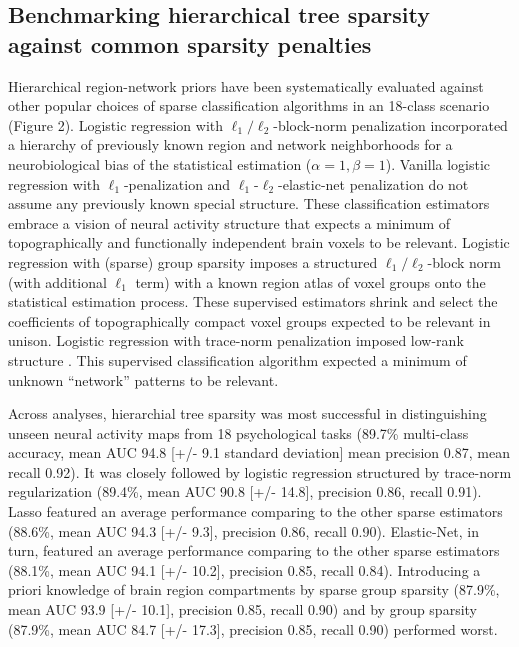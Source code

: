 \documentclass{article}
\begin{document}
\subsection{Benchmarking hierarchical tree sparsity against
common sparsity penalties}
Hierarchical region-network priors have been systematically
evaluated against other popular choices of sparse classification algorithms
in an 18-class scenario
(Figure 2).
%
Logistic regression with $\ell_1/\ell_2$-block-norm penalization
incorporated a hierarchy of previously known region and network neighborhoods
for a neurobiological bias of the statistical estimation
($\alpha = 1, \beta = 1$).
%
Vanilla logistic regression with $\ell_1$-penalization and
$\ell_1$-$\ell_2$-elastic-net penalization
do not assume any previously known special structure.
These classification estimators embrace a vision of neural activity structure
that expects a minimum of
topographically and functionally independent brain voxels to be relevant.
%
Logistic regression with (sparse) group sparsity
imposes a structured $\ell_1/\ell_2$-block norm (with additional $\ell_1$ term)
with a known region atlas of voxel groups
onto the statistical estimation process.
These supervised estimators shrink and select the coefficients
of topographically compact voxel groups expected to
be relevant in unison.
%
Logistic regression with trace-norm penalization
imposed low-rank structure \cite{harchaoui2012large}.
This supervised classification algorithm
expected a minimum of unknown ``network'' patterns
to be relevant.
%


Across analyses,
hierarchial tree sparsity was most successful
in distinguishing unseen neural activity maps from 18 psychological tasks
(89.7\% multi-class accuracy, mean AUC 94.8 [+/- 9.1 standard deviation]
mean precision 0.87, mean recall 0.92).
It was closely followed by logistic regression
structured by trace-norm regularization
(89.4\%, mean AUC 90.8 [+/- 14.8],
precision 0.86, recall 0.91).
Lasso featured an average performance comparing to the other sparse estimators
(88.6\%, mean AUC 94.3 [+/- 9.3],
precision 0.86, recall 0.90).
Elastic-Net, in turn, featured an
average performance comparing to the other sparse estimators
(88.1\%, mean AUC 94.1 [+/- 10.2],
precision 0.85, recall 0.84).
Introducing a priori knowledge of brain region compartments
by sparse group sparsity
(87.9\%, mean AUC 93.9 [+/- 10.1], precision 0.85, recall 0.90)
and
by group sparsity
(87.9\%, mean AUC 84.7 [+/- 17.3], precision 0.85, recall 0.90)
performed worst.
\end{document}
